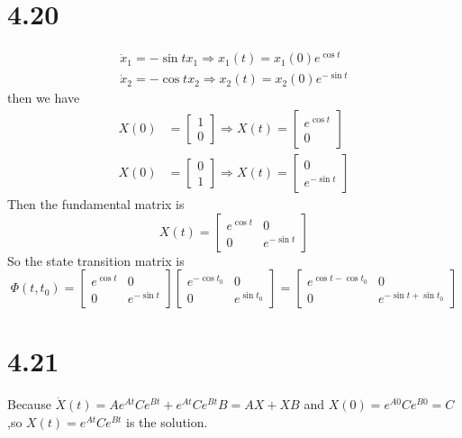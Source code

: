 \documentclass{article}
\begin{document}
\section*{4.20}
$$
\begin{array}{l}
\dot{x}_{1}=-\sin t x_{1} \Rightarrow x_{1}(t)=x_{1}(0) e^{\cos t} \\
\dot{x}_{2}=-\cos t x_{2} \Rightarrow x_{2}(t)=x_{2}(0) e^{-\sin t}
\end{array}
$$
then we have
$$
\begin{aligned}
X(0)&=\left[\begin{array}{l}1 \\ 0\end{array}\right] \Rightarrow X(t)=\left[\begin{array}{c}e^{\cos t} \\ 0\end{array}\right] \\
X(0)&=\left[\begin{array}{l}0 \\ 1\end{array}\right] \Rightarrow X(t)=\left[\begin{array}{c}0 \\ e^{-\sin t}\end{array}\right]
\end{aligned}
$$
Then the fundamental matrix is
\[X(t)=\left[\begin{array}{cc}e^{\cos t} & 0 \\ 0 & e^{-\sin t}\end{array}\right] \]
So the state transition matrix is
\[\Phi\left(t, t_{0}\right)=\left[\begin{array}{cc}e^{\cos t} & 0 \\ 0 & e^{-\sin t}\end{array}\right]\left[\begin{array}{cc}e^{-\cos t_{0}} & 0 \\ 0 & e^{\sin t_{0}}\end{array}\right]=\left[\begin{array}{cc}e^{\cos t-\cos t_{0}} & 0 \\ 0 & e^{-\sin t+\sin t_{0}}\end{array}\right]\]
\section*{4.21}
Because
$\dot{X}(t)=Ae^{At}Ce^{Bt}+e^{At}Ce^{Bt}B=AX+XB$
and
$X(0)=e^{A\dot0}Ce^{B\dot0}=C$
,so $X(t)=e^{At}Ce^{Bt}$ is the solution.
\end{document}
